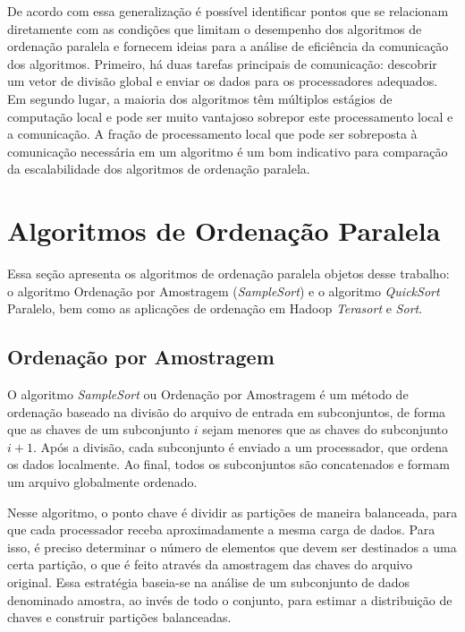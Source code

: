 De acordo com essa generalização  é possível identificar pontos que se relacionam diretamente com as condições que limitam o desempenho dos algoritmos de ordenação paralela e fornecem ideias para a análise de eficiência da comunicação dos algoritmos.
Primeiro, há duas tarefas principais de comunicação: descobrir um vetor de divisão global e enviar os dados para os processadores adequados. 
Em segundo lugar, a maioria dos algoritmos têm múltiplos estágios de computação local e pode ser muito vantajoso sobrepor este processamento local e a comunicação. 
A fração de  processamento local que pode ser sobreposta à comunicação necessária em um algoritmo  é um bom indicativo para comparação da escalabilidade dos algoritmos de ordenação paralela.

\section{Algoritmos de Ordenação Paralela}

Essa seção apresenta os algoritmos de ordenação paralela objetos desse trabalho: o algoritmo Ordenação por Amostragem  (\textit{SampleSort}) e o algoritmo \textit{QuickSort} Paralelo, bem como as aplicações de ordenação em Hadoop \textit{Terasort} e \textit{Sort}.  

\subsection{Ordenação por Amostragem}

O algoritmo \textit{SampleSort} ou Ordenação por Amostragem é um método de ordenação baseado na divisão do arquivo de entrada em subconjuntos, de forma que as chaves de um subconjunto $i$ sejam menores que as chaves do subconjunto $i+1$. Após a divisão, cada subconjunto é enviado a um processador, que ordena os dados localmente. Ao final, todos os subconjuntos são concatenados e formam um arquivo globalmente ordenado.

Nesse algoritmo, o ponto chave é dividir as partições de maneira balanceada, para que cada processador receba aproximadamente a mesma carga de dados. Para isso, é preciso determinar o número de elementos que devem ser destinados a uma certa partição, o que é feito através da amostragem das chaves do arquivo original. Essa estratégia baseia-se na análise de um subconjunto de dados  denominado amostra, ao invés de todo o conjunto, para estimar a distribuição de chaves e construir partições balanceadas.

